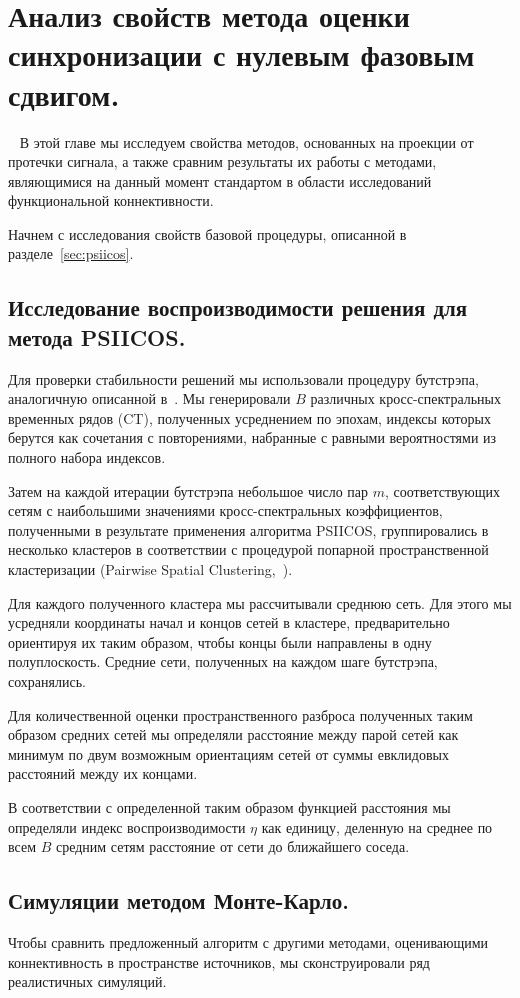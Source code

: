 \chapter{Анализ свойств метода оценки синхронизации с нулевым фазовым сдвигом.}~\label{chapt3}
В этой главе мы исследуем свойства методов, основанных на проекции от протечки сигнала,
а также сравним результаты их работы с методами, являющимися на данный
момент стандартом в области исследований функциональной коннективности.

Начнем с исследования свойств базовой процедуры, описанной в разделе~\ref{sec:psiicos}.
\section{Исследование воспроизводимости решения для метода PSIICOS.}\label{sec:bootstrap}

Для проверки стабильности решений мы использовали процедуру бутстрэпа, аналогичную
описанной в~\cite{Darvas2005}.
Мы генерировали $B$ различных кросс-спектральных временных рядов (CT), полученных
усреднением по эпохам, индексы которых берутся как сочетания с повторениями, набранные
с равными вероятностями из полного набора индексов.

Затем на каждой итерации бутстрэпа небольшое
число пар $m$, соответствующих сетям с наибольшими
значениями кросс-спектральных коэффициентов, полученными в результате применения
алгоритма PSIICOS, группировались в несколько кластеров в соответствии с процедурой
попарной пространственной кластеризации (Pairwise Spatial Clustering,~\cite{Zalesky2012}).

Для каждого полученного кластера мы рассчитывали среднюю сеть. Для этого мы усредняли
координаты начал и концов сетей в кластере, предварительно ориентируя их таким
образом, чтобы концы были направлены в одну полуплоскость.
Средние сети, полученных на каждом шаге бутстрэпа, сохранялись.

Для количественной оценки пространственного разброса полученных таким образом средних сетей
мы определяли расстояние между парой сетей как минимум по двум возможным ориентациям
сетей от суммы евклидовых расстояний между их концами.

В соответствии с определенной таким образом функцией расстояния мы определяли индекс
воспроизводимости $\eta$ как единицу, деленную на среднее по всем $B$ средним сетям расстояние
от сети до ближайшего соседа.

\section{Симуляции методом Монте-Карло.}\label{sec:monte_carlo_simulation}
Чтобы сравнить предложенный алгоритм с другими методами, оценивающими коннективность
в пространстве источников, мы сконструировали ряд реалистичных симуляций.

